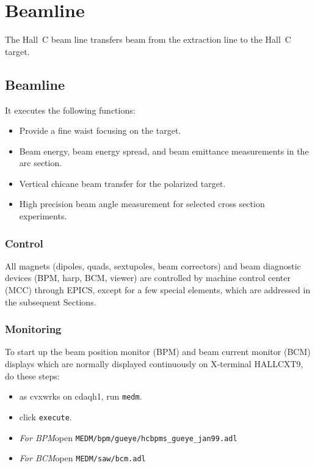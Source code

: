 \chapter{Beamline}

The Hall~C beam line transfers beam from the extraction line to the Hall~C target.

\section{Beamline}

It executes the following functions:

\begin{itemize}
\item{Provide a fine waist focusing on the target.}
\item{Beam energy, beam energy spread, and beam emittance measurements
in the arc section.}
\item{Vertical chicane beam transfer for the polarized target.}

\item{High precision beam angle measurement for selected cross section
experiments.}
\end{itemize}

\subsection{Control}

All magnets (dipoles, quads, sextupoles, beam
correctors) and beam diagnostic devices (BPM, harp, BCM, viewer)
are controlled by machine control center (MCC) through EPICS,
except for a few special elements, which are addressed in the
subsequent Sections.

\subsection{Monitoring}
To start up the beam position monitor (BPM) and beam current monitor
(BCM) displays which are normally displayed continuously on X-terminal
HALLCXT9, do these steps:
\begin{itemize}
  \item {as cvxwrks on cdaqh1, run \verb|medm|.}
  \item {click \verb|execute|.}
  \item {{\em For BPM}open \verb|MEDM/bpm/gueye/hcbpms_gueye_jan99.adl|}
  \item {{\em For BCM}open \verb|MEDM/saw/bcm.adl|}
\end{itemize}
  

